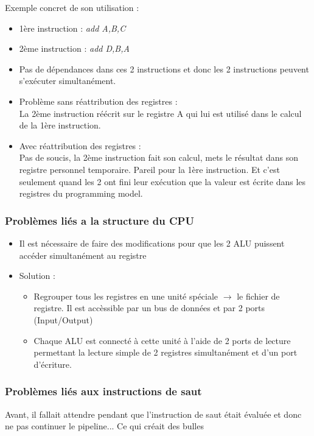 \documentclass[a4paper]{article}
\begin{document}
\begin{itemize}
      Exemple concret de son utilisation :
      \begin{itemize}
        \item 1ère instruction : \emph{add A,B,C}
        \item 2ème instruction : \emph{add D,B,A}
        \item Pas de dépendances dans ces 2 instructions et donc les 2 instructions peuvent s'exécuter simultanément.
        \item Problème sans réattribution des registres : \\La 2ème instruction réécrit sur le registre A qui lui est utilisé dans le calcul de la 1ère instruction.
        \item Avec réattribution des registres : \\ Pas de soucis, la 2ème instruction fait son calcul, mets le résultat dans son registre personnel temporaire. 
        Pareil pour la 1ère instruction. Et c'est seulement quand les 2 ont fini leur exécution que la valeur est écrite dans les registres du programming model.
      \end{itemize}
      
    \end{itemize}

    \subsubsection{Problèmes liés a la structure du CPU}
    \begin{itemize}
      \item Il est nécessaire de faire des modifications pour que les 2 ALU puissent accéder simultanément au registre
      \item Solution :
      \begin{itemize}
        \item Regrouper tous les registres en une unité spéciale $\rightarrow$ le fichier de registre. Il est accèssible par un bus de données et par 2 ports (Input/Output) 
        \item Chaque ALU est connecté à cette unité à l'aide de 2 ports de lecture permettant la lecture simple de 2 registres simultanément et d'un port d'écriture.
      \end{itemize}
    \end{itemize}

    \subsubsection{Problèmes liés aux instructions de saut}
    Avant, il fallait attendre pendant que l'instruction de saut était évaluée et donc ne pas continuer le pipeline... Ce qui créait des bulles
\end{document}
